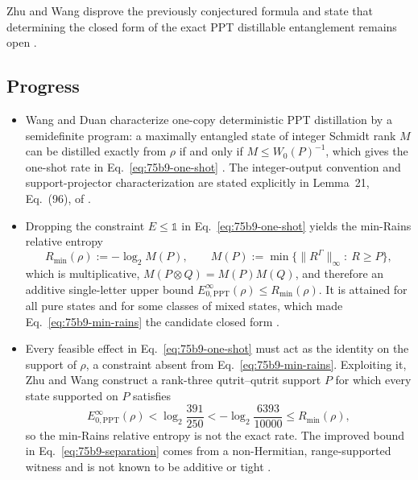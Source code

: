 Zhu and Wang disprove the previously conjectured formula and state that
determining the closed form of the exact PPT distillable entanglement
remains open .

\subsection*{Progress}

\begin{itemize}
  \item Wang and Duan characterize one-copy deterministic PPT distillation
  by a semidefinite program: a maximally entangled state of integer
  Schmidt rank $M$ can be distilled exactly from $\rho$ if and only if
  $M\leq W_0(P)^{-1}$, which gives the one-shot rate in
  Eq.~\eqref{eq:75b9-one-shot} .
  The integer-output convention and support-projector characterization
  are stated explicitly in Lemma~21, Eq.~(96), of
  .

  \item Dropping the constraint $E\leq\mathbb 1$ in
  Eq.~\eqref{eq:75b9-one-shot} yields the min-Rains relative entropy
  \begin{equation}
    R_{\min}(\rho):=-\log_2M(P),
    \qquad
    M(P):=\min\bigl\{\|R^{\Gamma}\|_\infty:\ R\geq P\bigr\},
    \label{eq:75b9-min-rains}
  \end{equation}
  which is multiplicative, $M(P\otimes Q)=M(P)M(Q)$, and therefore an
  additive single-letter upper bound
  $E^{\infty}_{0,\mathrm{PPT}}(\rho)\leq R_{\min}(\rho)$.  It is attained
  for all pure states and for some classes of mixed states, which made
  Eq.~\eqref{eq:75b9-min-rains} the candidate closed form
  .

  \item Every feasible effect in Eq.~\eqref{eq:75b9-one-shot} must act as
  the identity on the support of $\rho$, a constraint absent from
  Eq.~\eqref{eq:75b9-min-rains}.  Exploiting it, Zhu and Wang construct a
  rank-three qutrit--qutrit support $P$ for which every state supported on
  $P$ satisfies
  \begin{equation}
    E^{\infty}_{0,\mathrm{PPT}}(\rho)
    <\log_2\frac{391}{250}
    <-\log_2\frac{6393}{10000}
    \leq R_{\min}(\rho),
    \label{eq:75b9-separation}
  \end{equation}
  so the min-Rains relative entropy is not the exact rate.  The improved
  bound in Eq.~\eqref{eq:75b9-separation} comes from a non-Hermitian,
  range-supported witness and is not known to be additive or tight
  .


\end{itemize}
